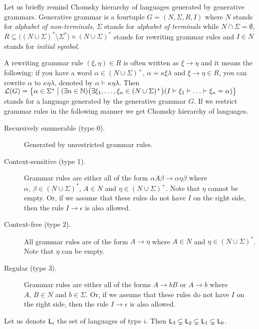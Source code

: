 		Let us briefly remind Chomsky hierarchy of languages generated by generative grammars. Generative grammar is a fourtuple $G = (N, \Sigma, R, I)$ where $N$ stands for {\em alphabet of non-terminals}, $\Sigma$ stands for {\em alphabet of terminals} while $N\cap\Sigma = \emptyset$, $R\subseteq\bigl((N\cup\Sigma)^*\setminus\Sigma^*\bigr) \times (N\cup\Sigma)^*$ stands for rewriting grammar rules and $I\in N$ stands for {\em initial symbol}.
		
		A rewriting grammar rule $(\xi,\eta)\in R$ is often written as $\xi\rightarrow\eta$ and it means the following: if you have a word $\alpha\in(N\cup\Sigma)^+$, $\alpha = \kappa\xi\lambda$ and $\xi\rightarrow\eta\in R$, you can rewrite $\alpha$ to $\kappa\eta\lambda$, denoted by $\alpha\vdash\kappa\eta\lambda$.
		Then ${\cal L}(G) = \bigl\{ \alpha\in\Sigma^* \bigm| (\exists n\in\mathbb{N})\bigl(\exists \xi_1, \ldots, \xi_n \in(N\cup\Sigma)^+\bigr)(I\vdash\xi_1\vdash\ldots\vdash\xi_n=\alpha) \bigr\}$ stands for a language generated by the generative grammar $G$. If we restrict grammar rules in the following manner we get Chomsky hierarchy of languages.
		\begin{description}
			\item[Recursively enumerable (type 0).] Generated by unrestricted grammar rules.
			\item[Context-sensitive (type 1).] Grammar rules are either all of the form $\alpha A \beta \rightarrow \alpha \eta \beta$ where $\alpha,\,\beta\in (N\cup\Sigma)^*$, $A\in N$ and $\eta\in (N\cup\Sigma)^+$. Note that $\eta$ cannot be empty. Or, if we assume that these rules do not have $I$ on the right side, then the rule $I\rightarrow \epsilon$ is also allowed.
			\item[Context-free (type 2).] All grammar rules are of the form $A\rightarrow\eta$ where $A\in N$ and $\eta\in (N\cup\Sigma)^*$. Note that $\eta$ can be empty.
			\item[Regular (type 3).] Grammar rules are either all of the forms $A\rightarrow bB$ or $A\rightarrow b$ where $A,\,B\in N$ and $b\in\Sigma$. Or, if we assume that these rules do not have $I$ on the right side, then the rule $I\rightarrow \epsilon$ is also allowed.
		\end{description}
		
		\begin{thm}
			Let us denote ${\sf L}_i$ the set of languages of type $i$. Then ${\sf L}_3\subsetneq{\sf L}_2\subsetneq{\sf L}_1\subsetneq{\sf L}_0$. 
		\end{thm}
		

